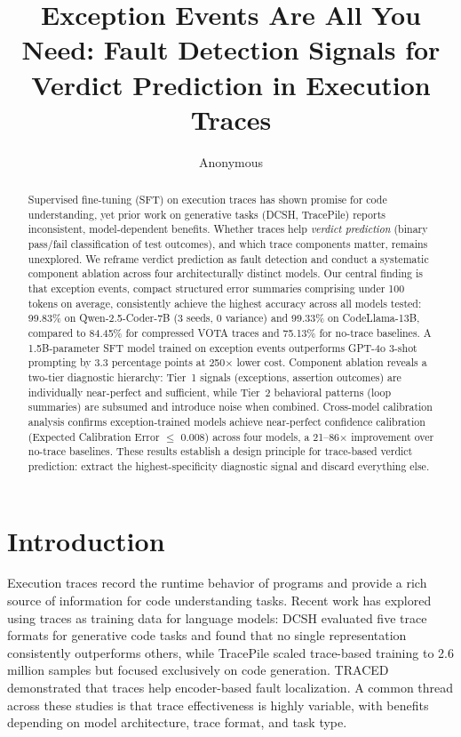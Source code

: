 \documentclass[11pt,a4paper]{article}
\title{Exception Events Are All You Need: Fault Detection Signals for\\Verdict Prediction in Execution Traces}
\author{Anonymous}
\date{}
\begin{document}
\maketitle

\begin{abstract}
Supervised fine-tuning (SFT) on execution traces has shown promise for code understanding, yet prior work on generative tasks (DCSH, TracePile) reports inconsistent, model-dependent benefits. Whether traces help \emph{verdict prediction} (binary pass/fail classification of test outcomes), and which trace components matter, remains unexplored. We reframe verdict prediction as fault detection and conduct a systematic component ablation across four architecturally distinct models. Our central finding is that exception events, compact structured error summaries comprising under 100 tokens on average, consistently achieve the highest accuracy across all models tested: 99.83\% on Qwen-2.5-Coder-7B (3 seeds, 0 variance) and 99.33\% on CodeLlama-13B, compared to 84.45\% for compressed VOTA traces and 75.13\% for no-trace baselines. A 1.5B-parameter SFT model trained on exception events outperforms GPT-4o 3-shot prompting by 3.3 percentage points at 250$\times$ lower cost. Component ablation reveals a two-tier diagnostic hierarchy: Tier~1 signals (exceptions, assertion outcomes) are individually near-perfect and sufficient, while Tier~2 behavioral patterns (loop summaries) are subsumed and introduce noise when combined. Cross-model calibration analysis confirms exception-trained models achieve near-perfect confidence calibration (Expected Calibration Error $\leq$ 0.008) across four models, a 21--86$\times$ improvement over no-trace baselines. These results establish a design principle for trace-based verdict prediction: extract the highest-specificity diagnostic signal and discard everything else.
\end{abstract}

\section{Introduction}

Execution traces record the runtime behavior of programs and provide a rich source of information for code understanding tasks. Recent work has explored using traces as training data for language models: DCSH \cite{dcsh2025} evaluated five trace formats for generative code tasks and found that no single representation consistently outperforms others, while TracePile \cite{tracepile2025} scaled trace-based training to 2.6 million samples but focused exclusively on code generation. TRACED \cite{traced2024} demonstrated that traces help encoder-based fault localization. A common thread across these studies is that trace effectiveness is highly variable, with benefits depending on model architecture, trace format, and task type.
\end{document}
